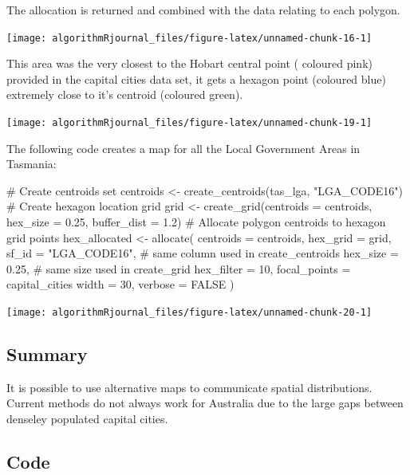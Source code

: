 The allocation is returned and combined with the data relating to each
polygon.

\begin{Schunk}

\texttt{[image: algorithmRjournal\_files/figure-latex/unnamed-chunk-16-1]} \end{Schunk}

This area was the very closest to the Hobart central point ( coloured
pink) provided in the capital cities data set, it gets a hexagon point
(coloured blue) extremely close to it's centroid (coloured green).

\begin{Schunk}

\texttt{[image: algorithmRjournal\_files/figure-latex/unnamed-chunk-19-1]} \end{Schunk}

The following code creates a map for all the Local Government Areas in
Tasmania:

\begin{Schunk}
\begin{Sinput}
# Create centroids set
centroids <- create_centroids(tas_lga, "LGA_CODE16")
# Create hexagon location grid
grid <- create_grid(centroids = centroids,
    hex_size = 0.25,
    buffer_dist = 1.2)
# Allocate polygon centroids to hexagon grid points
hex_allocated <- allocate(
  centroids = centroids,
  hex_grid = grid,
  sf_id = "LGA_CODE16",
  # same column used in create_centroids
  hex_size = 0.25,
  # same size used in create_grid
  hex_filter = 10,
  focal_points = capital_cities %
  width = 30,
  verbose = FALSE
)
\end{Sinput}
\end{Schunk}

\begin{Schunk}

\texttt{[image: algorithmRjournal\_files/figure-latex/unnamed-chunk-20-1]} \end{Schunk}

\hypertarget{summary}{%
\subsection{Summary}\label{summary}}

It is possible to use alternative maps to communicate spatial
distributions. Current methods do not always work for Australia due to
the large gaps between denseley populated capital cities.

\hypertarget{code}{%
\subsection{Code}\label{code}}

